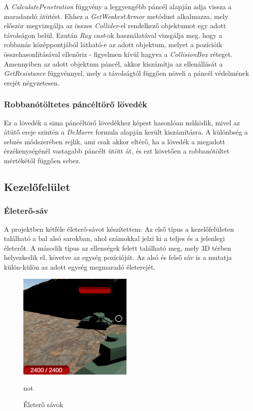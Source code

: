 \documentclass[
]{thesis-ekf}
\theoremstyle{definition}
\theoremstyle{remark}
\begin{document}
A \emph{CalculatePenetration} függvény a leggyengébb páncél alapján adja vissza a maradandó átütést. Ehhez a \emph{GetWeakestArmor} metódust alkalmazza, mely először megvizsgálja az összes \emph{Collider}-el rendelkező objektumot egy adott távolságon belül. Ezután \emph{Ray cast}-ok használatával vizsgálja meg. hogy a robbanás középpontjából látható-e az adott objektum, melyet a pozícióik összehasonlításával ellenőriz - figyelmen kívül hagyva a \emph{CollisionBox} réteget. Amennyiben az adott objektum páncél, akkor kiszámítja az ellenállását a \emph{GetResistance} függvénnyel, mely a távolságtól függően növeli a páncél védelmének erejét négyzetesen.


\subsubsection{Robbanótöltetes páncéltörő lövedék}

Ez a lövedék a sima páncéltörő lövedékhez képest hasonlóan működik, mivel az átütő ereje szintén a \emph{DeMarre} formula alapján került kiszámításra. A különbség a sebzés módszerében rejlik, ami csak akkor eltérő, ha a lövedék a megadott érzékenységénél vastagabb páncélt ütött át, és ezt követően a robbanótöltet mértékétől függően sebez.


\subsection{Kezelőfelület}

\subsubsection{Életerő-sáv}

A projektben kétféle életerő-sávot készítettem: Az első típus a kezelőfelületen található a bal alsó sarokban, ahol számokkal jelzi ki a teljes és a jelenlegi életerőt. A második típus az ellenségek felett található meg, mely 3D térben helyezkedik el, követve az egység pozícióját. Az alsó és felső sáv is a mutatja külön-külön az adott egység megmaradó életerejét.
\begin{figure}[H]
    \centering
    \includegraphics[width=0.5\textwidth]{screenshots/hpbar.png}
    \caption{Életerő sávok}
    \label{fig:healthbar}not
\end{figure}
\end{document}

